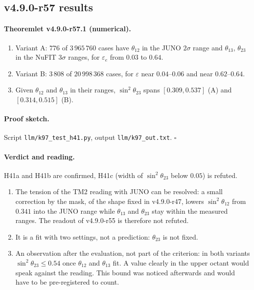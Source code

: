 \subsection*{v4.9.0-r57 results}
\label{subsec:v490-r57-results}

\paragraph{Theoremlet v4.9.0-r57.1 (numerical).}
\begin{enumerate}[leftmargin=2em]
\item[(a)] Variant A: \(776\) of \(3\,965\,760\) cases have \(\theta_{12}\) in the JUNO \(2\sigma\) range and \(\theta_{13}\), \(\theta_{23}\) in the NuFIT \(3\sigma\) ranges,
for \(\varepsilon_e\) from \(0.03\) to \(0.64\).
\item[(b)] Variant B: \(3\,808\) of \(20\,998\,368\) cases, for \(\varepsilon\) near \(0.04\)--\(0.06\) and near \(0.62\)--\(0.64\).
\item[(c)] Given \(\theta_{12}\) and \(\theta_{13}\) in their ranges, \(\sin^2\theta_{23}\) spans \([0.309,0.537]\) (A) and \([0.314,0.515]\) (B).
\end{enumerate}

\paragraph{Proof sketch.}
Script \texttt{llm/k97\_test\_h41.py}, output \texttt{llm/k97\_out.txt}.  \(\square\)

\paragraph{Verdict and reading.}
H41a and H41b are confirmed, H41c (width of \(\sin^2\theta_{23}\) below \(0.05\)) is refuted.
\begin{enumerate}[leftmargin=2em]
\item The tension of the TM2 reading with JUNO can be resolved: a small correction by the mask, of the shape fixed in v4.9.0-r47, lowers \(\sin^2\theta_{12}\) from
\(0.341\) into the JUNO range while \(\theta_{13}\) and \(\theta_{23}\) stay within the measured ranges.  The readout of v4.9.0-r55 is therefore not refuted.
\item It is a fit with two settings, not a prediction: \(\theta_{23}\) is not fixed.
\item An observation after the evaluation, not part of the criterion: in both variants \(\sin^2\theta_{23}\le0.54\) once \(\theta_{12}\) and \(\theta_{13}\) fit.  A value
clearly in the upper octant would speak against the reading.  This bound was noticed afterwards and would have to be pre-registered to count.
\end{enumerate}

